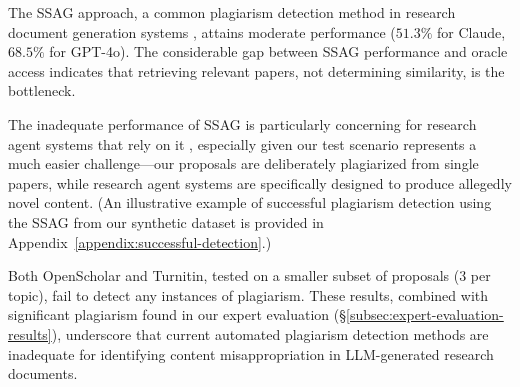 The SSAG approach,
a common plagiarism detection method 
in research document generation systems \citep{si2024can,lu2024ai,li2024chain}, 
attains moderate performance ($51.3\%$ for Claude, $68.5\%$ for GPT-4o).
The considerable gap between 
SSAG performance and oracle access 
indicates that retrieving relevant papers, not determining similarity, 
is the bottleneck.

The inadequate performance of SSAG is particularly concerning for research agent systems that rely on it \citep{si2024can,lu2024ai,li2024chain}, especially given our test scenario represents a much easier challenge---our proposals are deliberately plagiarized from single papers, while research agent systems are specifically designed to produce allegedly novel content. (An illustrative example of 
successful plagiarism detection 
using the SSAG
from our synthetic dataset is provided in Appendix~\ref{appendix:successful-detection}.)

Both OpenScholar and Turnitin, 
tested on a smaller subset of proposals ($3$ per topic), 
fail to detect any instances of plagiarism. 
These results, 
combined with significant plagiarism found in our expert evaluation (\S\ref{subsec:expert-evaluation-results}), 
underscore that current automated plagiarism detection methods are inadequate 
for identifying content misappropriation in LLM-generated research documents.


